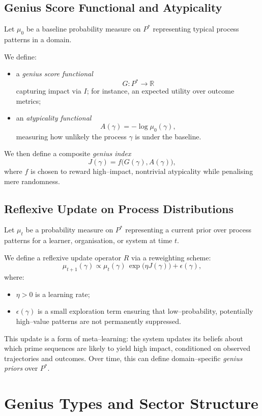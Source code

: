 \documentclass[11pt]{article}
\begin{document}
\subsection{Genius Score Functional and Atypicality}

Let $\mu_0$ be a baseline probability measure on $P^\ast$ representing typical process patterns in a domain.

We define:
\begin{itemize}[nosep]
  \item a \emph{genius score functional}
  \[
  G: P^\ast \to \mathbb{R}
  \]
  capturing impact via $I$; for instance, an expected utility over outcome metrics;
  \item an \emph{atypicality functional}
  \[
  A(\gamma) = -\log \mu_0(\gamma),
  \]
  measuring how unlikely the process $\gamma$ is under the baseline.
\end{itemize}

We then define a composite \emph{genius index}
\[
J(\gamma) = f\bigl(G(\gamma), A(\gamma)\bigr),
\]
where $f$ is chosen to reward high--impact, nontrivial atypicality while penalising mere randomness.

\subsection{Reflexive Update on Process Distributions}

Let $\mu_t$ be a probability measure on $P^\ast$ representing a current prior over process patterns for a learner, organisation, or system at time $t$.

We define a reflexive update operator $R$ via a reweighting scheme:
\[
\mu_{t+1}(\gamma) \propto \mu_t(\gamma)\,\exp\bigl(\eta J(\gamma)\bigr) + \epsilon(\gamma),
\]
where:
\begin{itemize}[nosep]
  \item $\eta>0$ is a learning rate;
  \item $\epsilon(\gamma)$ is a small exploration term ensuring that low--probability, potentially high--value patterns are not permanently suppressed.
\end{itemize}

This update is a form of meta--learning: the system updates its beliefs about which prime sequences are likely to yield high impact, conditioned on observed trajectories and outcomes.
Over time, this can define domain--specific \emph{genius priors} over $P^\ast$.

\section{Genius Types and Sector Structure}
\end{document}
